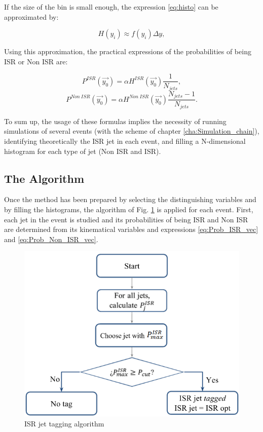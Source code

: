 \documentclass[12pt, oneside]{book}              %
\begin{document}
If the size of the bin is small enough, the expression \ref{eq:histo} can be approximated by:

\begin{equation} \label{eq:Approx_histo}
H(y_i) \approx f(y_i)\Delta y,
\end{equation}

Using this approximation, the practical expressions of the probabilities of being ISR or Non ISR are:

\begin{equation} \label{eq:Prob_ISR_hist}
P^{ISR}(\vec{y_0}) = \alpha H^{ISR}(\vec{y_0}) \frac{1}{N_{jets}},
\end{equation}
\begin{equation} \label{eq:Prob_Non_ISR_hist}
P^{Non\ ISR}(\vec{y_0}) = \alpha H^{Non\ ISR}(\vec{y_0}) \frac{N_{jets}-1}{N_{jets}}.
\end{equation}

To sum up, the usage of these formulas implies the necessity of running 
simulations of several events (with the scheme of chapter \ref{cha:Simulation_chain}),
identifying theoretically the ISR jet in each event, and filling a N-dimensional histogram
for each type of jet (Non ISR and ISR).

\subsection{The Algorithm} \label{sub:Algorithm}

Once the method has been prepared by selecting the distinguishing variables and 
by filling the histograms, the algorithm of Fig. \ref{fig:Tagging_algorithm} 
is applied for each event. First, each jet in the event is studied and its
probabilities of being ISR and Non ISR are determined from
its kinematical variables and expressions \ref{eq:Prob_ISR_vec} and \ref{eq:Prob_Non_ISR_vec}.

\begin{figure}[h]
	\centering
	\includegraphics[width=0.8\linewidth]{./Imags_Doc/Tagging_algorithm}
	\caption[ISR jet tagging algorithm]{ISR jet tagging algorithm}
	\label{fig:Tagging_algorithm}
\end{figure}
\end{document}
